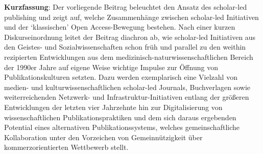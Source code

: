 \textbf{Kurzfassung}: Der vorliegende Beitrag beleuchtet den Ansatz des
scholar-led publishing und zeigt auf, welche Zusammenhänge zwischen
scholar-led Initiativen und der \enquote*{klassischen} Open Access-Bewegung
bestehen. Nach einer kurzen Diskurseinordnung leitet der Beitrag
diachron ab, wie scholar-led Initiativen aus den Geistes- und
Sozialwissenschaften schon früh und parallel zu den weithin rezipierten
Entwicklungen aus dem medizinisch-naturwissenschaftlichen Bereich der
1990er Jahre auf eigene Weise wichtige Impulse zur Öffnung von
Publikationskulturen setzten. Dazu werden exemplarisch eine Vielzahl von
medien- und kulturwissenschaftlichen scholar-led Journals, Buchverlagen
sowie weiterreichenden Netzwerk- und Infrastruktur-Initiativen entlang
der größeren Entwicklungen der letzten vier Jahrzehnte hin zur
Digitalisierung von wissenschaftlichen Publikationspraktiken und dem
sich daraus ergebenden Potential eines alternativen Publikationssystems,
welches gemeinschaftliche Kollaboration unter den Vorzeichen von
Gemeinnützigkeit über kommerzorientierten Wettbewerb stellt.
